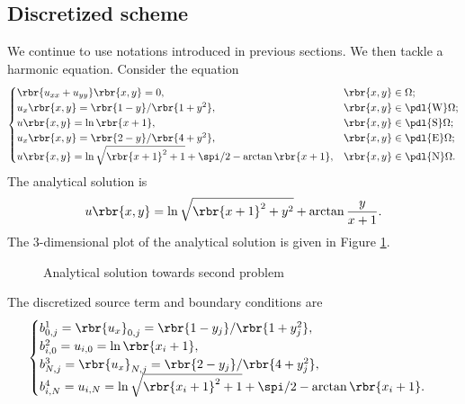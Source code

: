 \documentclass[english, nochinese]{pnote}
\begin{document}
\subsection{Discretized scheme}

We continue to use notations introduced in previous sections. We then tackle a harmonic equation. Consider the equation
\begin{equation}
\begin{cases}
\rbr{ u_{ x x } + u_{ y y } } \rbr{ x, y } = 0, & \rbr{ x, y } \in \Omega; \\
u_x \rbr{ x, y } = \rbr{ 1 - y } / \rbr{ 1 + y^2 }, & \rbr{ x, y } \in \pdl{\text{W}} \Omega; \\
u \rbr{ x, y } = \ln \rbr{ x + 1 }, & \rbr{ x, y } \in \pdl{\text{S}} \Omega; \\
u_x \rbr{ x, y } = \rbr{ 2 - y } / \rbr{ 4 + y^2 }, & \rbr{ x, y } \in \pdl{\text{E}} \Omega; \\
u \rbr{ x, y } = \ln \sqrt{ \rbr{ x + 1 }^2 + 1 } + \spi / 2 - \arctan \rbr{ x + 1 }, & \rbr{ x, y } \in \pdl{\text{N}} \Omega.
\end{cases}
\end{equation}
The analytical solution is
\begin{equation}
u \rbr{ x, y } = \ln \sqrt{ \rbr{ x + 1 }^2 + y^2 } + \arctan \frac{y}{ x + 1 }.
\end{equation}
The 3-dimensional plot of the analytical solution is given in Figure \ref{Fig:Prob23D}.
\begin{figure}[htbp]
\centering

\caption{Analytical solution towards second problem}
\label{Fig:Prob23D}
\end{figure}
The discretized source term and boundary conditions are
\begin{gather}
\begin{cases}
b^1_{ 0, j } = \rbr{u_x}_{ 0, j } = \rbr{ 1 - y_j } / \rbr{ 1 + y_j^2 }, \\
b^2_{ i, 0 } = u_{ i, 0 } = \ln \rbr{ x_i + 1 }, \\
b^3_{ N, j } = \rbr{u_x}_{ N, j } = \rbr{ 2 - y_j } / \rbr{ 4 + y_j^2 }, \\
b^4_{ i, N } = u_{ i, N } = \ln \sqrt{ \rbr{ x_i + 1 }^2 + 1 } + \spi / 2 - \arctan \rbr{ x_i + 1 }.
\end{cases}
\end{gather}
\end{document}
